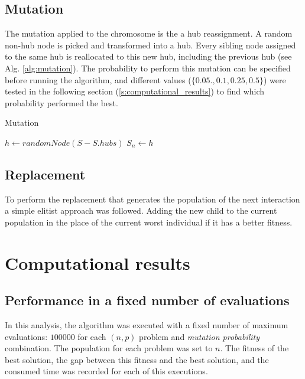 \documentclass[onecolumn]{IEEEtran}
\begin{document}
\subsection{Mutation\label{ss:mutation}}

The mutation applied to the chromosome is the a hub reassignment. A random non-hub node is
picked and transformed into a hub. Every sibling node assigned to the same hub is reallocated
to this new hub, including the previous hub (see Alg. \ref{alg:mutation}).
The probability to perform this mutation can be specified before running the algorithm,
and different values ($\{0.05., 0.1, 0.25, 0.5\}$) were tested in the following section 
(\ref{s:computational_results})
to find which probability performed the best.

\begin{algorithm}[H]
  \caption{Mutation}
  \label{alg:mutation}
  \begin{algorithmic}[1]
    \State $h \gets randomNode(S - S.hubs)$
        \State $S_{n} \gets h$
      \EndIf
    \EndFor
  \end{algorithmic}
\end{algorithm}

\subsection{Replacement}

To perform the replacement that generates the population of the next interaction a simple
elitist approach was followed. Adding the new child to the current population in the place
of the current worst individual if it has a better fitness.

\section{Computational results\label{s:computational_results}}

%

\subsection{Performance in a fixed number of evaluations\label{ss:benchmark_evaluations}}

In this analysis, the algorithm was executed with a fixed number of maximum evaluations: $100000$
for each $(n,p)$ problem and \emph{mutation probability} combination. The population for each
problem was set to $n$. The fitness of the best solution, the gap between this fitness and the best
solution, and the consumed time was recorded for each of this executions.
\end{document}
